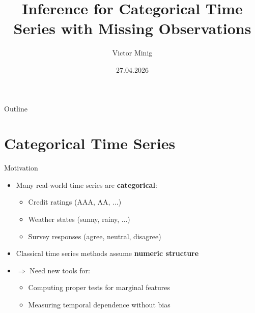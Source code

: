 \documentclass{beamer}
\title{Inference for Categorical Time Series with Missing Observations}
\author{Victor Minig}
\date{27.04.2026}
\begin{document}
\frame{\titlepage}

\begin{frame}{Outline}
\tableofcontents
\end{frame}

\section{Categorical Time Series}

\begin{frame}{Motivation}
\begin{itemize}
    \item Many real-world time series are \textbf{categorical}:
    \begin{itemize}
        \item Credit ratings (AAA, AA, ...)
        \item Weather states (sunny, rainy, ...)
        \item Survey responses (agree, neutral, disagree)
    \end{itemize}
    
    \vspace{0.3cm}
    
    \item Classical time series methods assume \textbf{numeric structure}
    
    \vspace{0.3cm}
    
    \item $\Rightarrow$ Need new tools for:
    \begin{itemize}
        \item Computing proper tests for marginal features 
        \item Measuring temporal dependence without bias 
    \end{itemize}
\end{itemize}
\end{frame}
\end{document}
